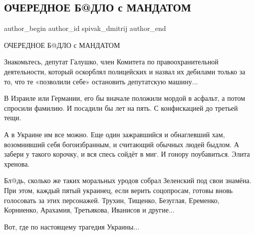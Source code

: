  
 
 
 
 
 
\subsection{ОЧЕРЕДНОЕ Б@ДЛО с МАНДАТОМ}
\label{sec:22_12_2021.fb.spivak_dmitrij.1.bydlo_s_mandatom}
 
\ifcmt
 author_begin
   author_id spivak_dmitrij
 author_end
\fi

ОЧЕРЕДНОЕ Б@ДЛО с МАНДАТОМ

Знакомьтесь, депутат Галушко, член Комитета по правоохранительной деятельности,
который оскорблял полицейских и назвал их дебилами только за то, что те
«позволили себе» остановить депутатскую машину... 


В Израиле или Германии, его бы вначале положили мордой в асфальт, а потом
спросили фамилию. И посадили бы лет на пять. С конфискацией до третьей тещи. 

А в Украине им все можно. Еще один зажравшийся и обнаглевший хам, возомнивший
себя богоизбранным, и считающий обычных людей быдлом. А забери у такого
корочку, и вся спесь сойдёт в миг. И гонору поубавиться. Элита хренова. 

Бл@дь, сколько же таких моральных уродов собрал Зеленский под свои знамёна. При
этом, каждый пятый украинец, если верить соцопросам, готовы вновь голосовать за
этих персонажей. Трухин, Тищенко, Безуглая, Еременко, Корниенко, Арахамия,
Третьякова, Иванисов и другие...

Вот, где по настоящему трагедия Украины...
